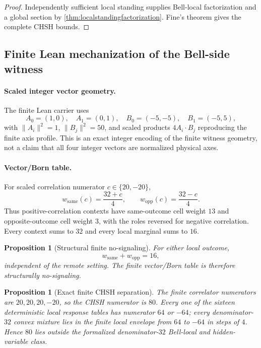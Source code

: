 \documentclass[11pt]{article}
\newtheorem{proposition}[theorem]{Proposition}
\theoremstyle{definition}
\begin{document}
\begin{proof}
Independently sufficient local standing supplies Bell-local factorization and a global section by \cref{thm:localstandingfactorization}. Fine's theorem gives the complete CHSH bounds.
\end{proof}

\subsection{Finite Lean mechanization of the Bell-side witness}\label{sec:leanfinite}

\paragraph{Scaled integer vector geometry.}
The finite Lean carrier uses
\[
A_0=(1,0),\quad A_1=(0,1),\quad B_0=(-5,-5),\quad B_1=(-5,5),
\]
with $\|A_i\|^2=1$, $\|B_j\|^2=50$, and scaled products $4A_i\!\cdot B_j$ reproducing the finite axis profile. This is an exact integer encoding of the finite witness geometry, not a claim that all four integer vectors are normalized physical axes.

\paragraph{Vector/Born table.}
For scaled correlation numerator $c\in\{20,-20\}$,
\[
w_{\mathrm{same}}(c)=\frac{32+c}{4},\qquad
w_{\mathrm{opp}}(c)=\frac{32-c}{4}.
\]
Thus positive-correlation contexts have same-outcome cell weight $13$ and opposite-outcome cell weight $3$, with the roles reversed for negative correlation. Every context sums to $32$ and every local marginal sums to $16$.

\begin{proposition}[Structural finite no-signaling]\label{prop:structuralfinitenosig}
For either local outcome,
\[
w_{\mathrm{same}}+w_{\mathrm{opp}}=16,
\]
independent of the remote setting. The finite vector/Born table is therefore structurally no-signaling.
\end{proposition}

\begin{proposition}[Exact finite CHSH separation]\label{prop:finitechshseparation}
The finite correlator numerators are $20,20,20,-20$, so the CHSH numerator is $80$. Every one of the sixteen deterministic local response tables has numerator $64$ or $-64$; every denominator-$32$ convex mixture lies in the finite local envelope from $64$ to $-64$ in steps of $4$. Hence $80$ lies outside the formalized denominator-$32$ Bell-local and hidden-variable class.
\end{proposition}
\end{document}

